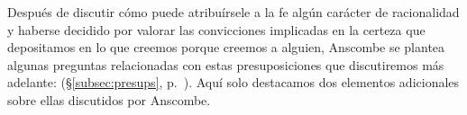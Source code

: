 Después de discutir cómo puede atribuírsele a la fe algún carácter de racionalidad y haberse decidido por valorar las convicciones implicadas en la certeza que depositamos en lo que creemos porque creemos a alguien,
Anscombe se plantea algunas preguntas relacionadas con estas presuposiciones que discutiremos más adelante: (\S\ref{subsec:presups}, p.~\pageref{subsec:presups}). Aquí solo destacamos dos elementos adicionales sobre ellas discutidos por Anscombe.

